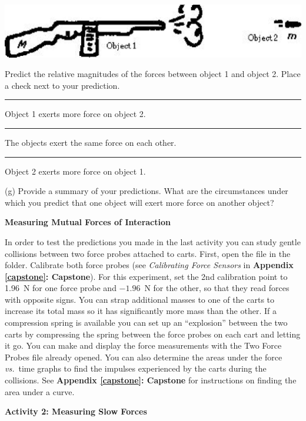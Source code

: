 \vspace{0.3cm}
{\par\centering \includegraphics{newtons_laws/newtons_laws_fig6.eps} \par}
\vspace{0.3cm}

Predict the relative magnitudes of the forces between object 1 and object 2.
Place a check next to your prediction. 

\rule{0.5in}{0.1pt} Object 1 exerts more force on object 2. 

\rule{0.5in}{0.1pt} The objects exert the same force on each other. 

\rule{0.5in}{0.1pt} Object 2 exerts more force on object 1.

(g) Provide a summary of your predictions. What are the circumstances under
which you predict that one object will exert more force on another object?
\vspace{30mm}

\textbf{Measuring Mutual Forces of Interaction }

In order to test the predictions you made in the last activity you can study
gentle collisions between two force probes attached to carts. First, open the file 
in the \filename{\coursefolder} folder.  Calibrate both force probes 
(see \textit{Calibrating Force Sensors} in \textbf{Appendix \ref{capstone}: Capstone}). 
For this experiment, set the 2nd calibration point to 1.96~N for one force probe and $-1.96$~N for the other, so that they read forces with opposite signs. 
You can strap additional masses to one of the carts to increase its total mass so it has significantly
more mass than the other. If a compression spring is available you can set up
an ``explosion'' between the two carts by compressing the spring
between the force probes on each cart and letting it go. You can make and display the force measurements with the Two Force Probes file already opened. You can also determine the areas under the force \textit{vs.}~time graphs to find the impulses experienced by the carts during the collisions. See \textbf{Appendix \ref{capstone}: Capstone} for instructions on finding the area under a curve.

\textbf{Activity 2: Measuring Slow Forces} 

